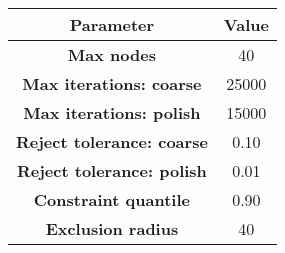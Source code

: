 \begin{tabular}{cc}
\toprule
\textbf{Parameter} &    Value \\
\midrule
\textbf{Max nodes               } &    40 \\
\textbf{Max iterations: coarse  } & 25000 \\
\textbf{Max iterations: polish  } & 15000 \\
\textbf{Reject tolerance: coarse} &     0.10 \\
\textbf{Reject tolerance: polish} &     0.01 \\
\textbf{Constraint quantile     } &     0.90 \\
\textbf{Exclusion radius        } &    40 \\
\bottomrule
\end{tabular}
